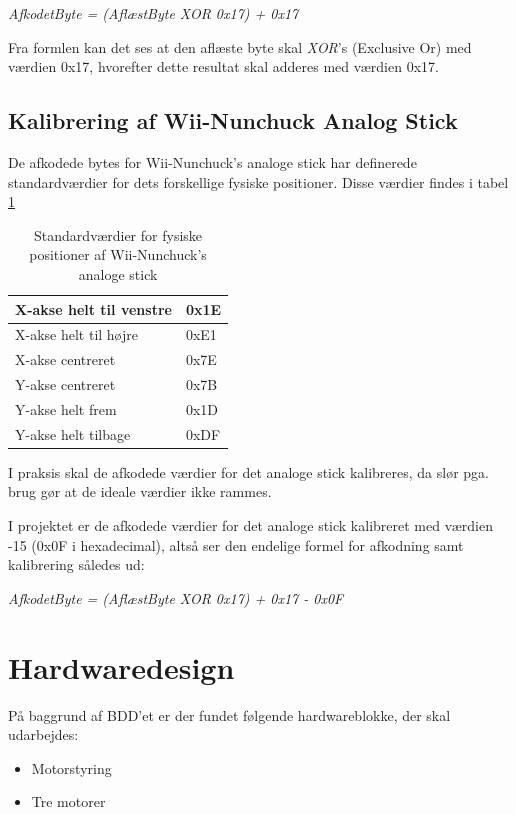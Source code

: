 \textit{AfkodetByte = (AflæstByte XOR 0x17) + 0x17}

Fra formlen kan det ses at den aflæste byte skal \textit{XOR}'s (Exclusive Or) med værdien 0x17, hvorefter dette resultat skal adderes med værdien 0x17.

\subsection{Kalibrering af Wii-Nunchuck Analog Stick}
De afkodede bytes for Wii-Nunchuck's analoge stick har definerede standardværdier for dets forskellige fysiske positioner. Disse værdier findes i tabel \ref{tabel:WiiNunchuckStickPositioner}

\begin{table}[H]
	\centering
	\begin{tabular}{|l|l|}
		\hline
		X-akse helt til venstre & 0x1E \\ \hline
		X-akse helt til højre   & 0xE1 \\ \hline
		X-akse centreret        & 0x7E \\ \hline
		Y-akse centreret        & 0x7B \\ \hline
		Y-akse helt frem        & 0x1D \\ \hline
		Y-akse helt tilbage     & 0xDF \\ \hline
	\end{tabular}
	\caption{Standardværdier for fysiske positioner af Wii-Nunchuck's analoge stick}
	\label{tabel:WiiNunchuckStickPositioner}
\end{table}

I praksis skal de afkodede værdier for det analoge stick kalibreres, da slør pga. brug gør at de ideale værdier ikke rammes. 

I projektet er de afkodede værdier for det analoge stick kalibreret med værdien -15 (0x0F i hexadecimal), altså ser den endelige formel for afkodning samt kalibrering således ud:

\textit{AfkodetByte = (AflæstByte XOR 0x17) + 0x17 - 0x0F}

\section{Hardwaredesign}
På baggrund af BDD'et er der fundet følgende hardwareblokke, der skal udarbejdes: 
\begin{itemize}
	\item Motorstyring
	\item Tre motorer
\end{itemize}

